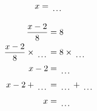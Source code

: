 \documentclass[12pt]{article}
\newcounter{minipagecount}
\begin{document}
\begin{multicols}{2}
\begin{minipage}[t]{0.45\textwidth}
\begin{align*}
        x &= \dotuline{\hspace{5mm}}\\
    \end{align*}
\end{minipage} %
\noindent{(\theminipagecount)}\hspace{0.1mm} %
\begin{minipage}[t]{0.45\textwidth} %
    \vspace{-26pt}  %
    \raggedright %
    \begin{align*} %
        \frac{x - 2}{8} &= 8\\
        \frac{x - 2}{8} \times\dotuline{\hspace{5mm}} &= 8 \times\dotuline{\hspace{5mm}}\\
        x - 2 &= \dotuline{\hspace{5mm}}\\
        x - 2 + \dotuline{\hspace{5mm}} &= \dotuline{\hspace{5mm}} + \dotuline{\hspace{5mm}}\\
        x &= \dotuline{\hspace{5mm}}\\
    \end{align*}
\end{minipage}\newpage
\noindent{(\theminipagecount)}\hspace{0.1mm} %
\begin{minipage}[t]{0.45\textwidth} %
    \vspace{-26pt}  %

\end{minipage}
\end{multicols}
\end{document}
